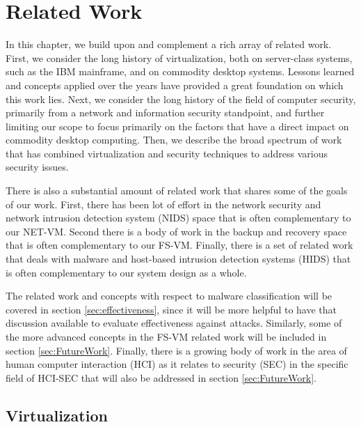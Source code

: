
\chapter{Related Work}
\label{sec:related}

In this chapter, we build upon and complement a rich array of related work. First, we consider the long history of virtualization, both on server-class systems, such as the IBM mainframe, and on commodity desktop systems. Lessons learned and concepts applied over the years have provided a great foundation on which this work lies. Next, we consider the long history of the field of computer security, primarily from a network and information security standpoint, and further limiting our scope to focus primarily on the factors that have a direct impact on commodity desktop computing. Then, we describe the broad spectrum of work that has combined virtualization and security techniques to address various security issues.

There is also a substantial amount of related work that shares some of the goals of our work. First, there has been lot of effort in the network security and network intrusion detection system (NIDS) space that is often complementary to our NET-VM. Second there is a body of work in the backup and recovery space that is often complementary to our FS-VM. Finally, there is a set of related work that deals with malware and host-based intrusion detection systems (HIDS) that is often complementary to our system design as a whole.

The related work and concepts with respect to malware classification will be covered in section \ref{sec:effectiveness}, since it will be more helpful to have that discussion available to evaluate effectiveness against attacks. Similarly, some of the more advanced concepts in the FS-VM related work will be included in section \ref{sec:FutureWork}. Finally, there is a growing body of work in the area of human computer interaction (HCI) as it relates to security (SEC) in the specific field of HCI-SEC that will also be addressed in section \ref{sec:FutureWork}.


\section{Virtualization}

